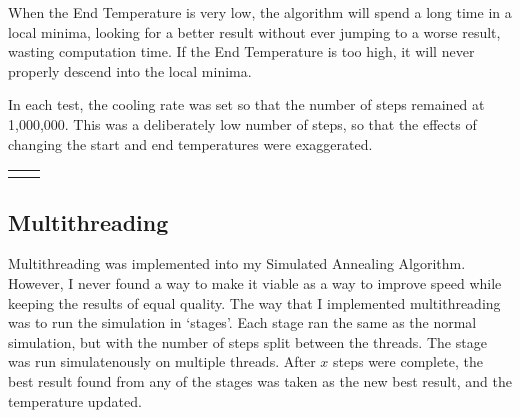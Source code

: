\documentclass[a4paper, 11pt,table]{article}
\begin{document}
	When the End Temperature is very low, the algorithm will spend a long time in a local minima, looking for a better result without ever jumping to a worse result, wasting computation time. If the End Temperature is too high, it will never properly descend into the local minima.
	
	In each test, the cooling rate was set so that the number of steps remained at 1,000,000. This was a deliberately low number of steps, so that the effects of changing the start and end temperatures were exaggerated.
	
			
	\begin{tabu}{X[c] X[c]}		
		&
	\end{tabu}


\subsection{Multithreading}
Multithreading was implemented into my Simulated Annealing Algorithm. However, I never found a way to make it viable as a way to improve speed while keeping the results of equal quality. The way that I implemented multithreading was to run the simulation in `stages'. Each stage ran the same as the normal simulation, but with the number of steps split between the threads. The stage was run simulatenously on multiple threads. After $x$ steps were complete, the best result found from any of the stages was taken as the new best result, and the temperature updated.
\end{document}
